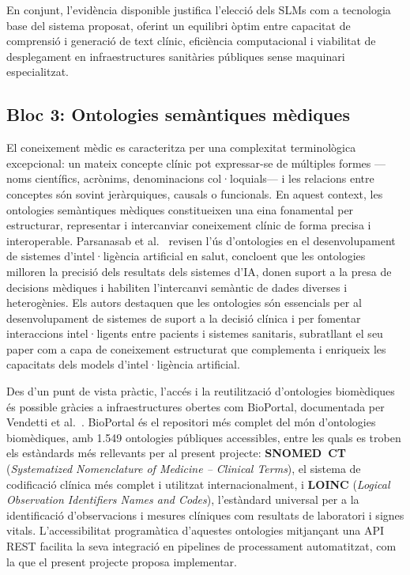 \documentclass[CAT]{TFUOC}%
\begin{document}
En conjunt, l'evidència disponible justifica l'elecció dels SLMs com a tecnologia base del sistema proposat, oferint un equilibri òptim entre capacitat de comprensió i generació de text clínic, eficiència computacional i viabilitat de desplegament en infraestructures sanitàries públiques sense maquinari especialitzat.

\subsection{Bloc 3: Ontologies semàntiques mèdiques}

El coneixement mèdic es caracteritza per una complexitat terminològica excepcional: un mateix concepte clínic pot expressar-se de múltiples formes ---noms científics, acrònims, denominacions col·loquials--- i les relacions entre conceptes són sovint jeràrquiques, causals o funcionals. En aquest context, les ontologies semàntiques mèdiques constitueixen una eina fonamental per estructurar, representar i intercanviar coneixement clínic de forma precisa i interoperable. Parsanasab et al.~\cite{parsanasab2025ontologies} revisen l'ús d'ontologies en el desenvolupament de sistemes d'intel·ligència artificial en salut, concloent que les ontologies milloren la precisió dels resultats dels sistemes d'IA, donen suport a la presa de decisions mèdiques i habiliten l'intercanvi semàntic de dades diverses i heterogènies. Els autors destaquen que les ontologies són essencials per al desenvolupament de sistemes de suport a la decisió clínica i per fomentar interaccions intel·ligents entre pacients i sistemes sanitaris, subratllant el seu paper com a capa de coneixement estructurat que complementa i enriqueix les capacitats dels models d'intel·ligència artificial.

Des d'un punt de vista pràctic, l'accés i la reutilització d'ontologies biomèdiques és possible gràcies a infraestructures obertes com BioPortal, documentada per Vendetti et al.~\cite{vendetti2025bioportal}. BioPortal és el repositori més complet del món d'ontologies biomèdiques, amb 1.549 ontologies públiques accessibles, entre les quals es troben els estàndards més rellevants per al present projecte: \textbf{SNOMED~CT} (\textit{Systematized Nomenclature of Medicine -- Clinical Terms}), el sistema de codificació clínica més complet i utilitzat internacionalment, i \textbf{LOINC} (\textit{Logical Observation Identifiers Names and Codes}), l'estàndard universal per a la identificació d'observacions i mesures clíniques com resultats de laboratori i signes vitals. L'accessibilitat programàtica d'aquestes ontologies mitjançant una API REST facilita la seva integració en pipelines de processament automatitzat, com la que el present projecte proposa implementar.
\end{document}
